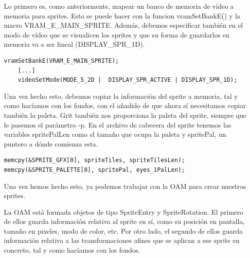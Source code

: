 Lo primero es, como anteriormente, mapear un banco de memoria de vídeo a memoria para sprites. Esto se puede hacer con la funcion vramSetBankE() y la macro VRAM\_E\_MAIN\_SPRITE. Además, debemos especificar también en el modo de vídeo que se visualicen los sprites y que su forma de guardarlos en memoria va a ser lineal (DISPLAY\_SPR\_1D).

\vspace{0.5cm}

\begin{lstlisting}[caption={Mapeo del banco E a memoria de sprites}, label={code:vrame}]
	vramSetBankE(VRAM_E_MAIN_SPRITE);
	[...]
	videoSetMode(MODE_5_2D |  DISPLAY_SPR_ACTIVE | DISPLAY_SPR_1D);
\end{lstlisting}

\vspace{0.5cm}

Una vez hecho esto, debemos copiar la información del sprite a memoria, tal y como hacíamos con los fondos, con el añadido de que ahora sí necesitamos copiar también la paleta. Grit también nos proporciona la paleta del sprite, siempre que le pasemos el parámetro -p. En el archivo de cabecera del sprite tenemos las variables spritePalLen como el tamaño que ocupa la paleta y spritePal, un puntero a dónde comienza esta.

\vspace{0.5cm}

\begin{lstlisting}[caption={Copia de la información de sprites a memoria de video}, label={code:spritememcpy}]
memcpy(&SPRITE_GFX[0], spriteTiles, spriteTilesLen);
memcpy(&SPRITE_PALETTE[0], spritePal, eyes_1PalLen);
\end{lstlisting}

\vspace{0.5cm}

Una vez hemos hecho esto, ya podemos trabajar con la OAM para crear nuestros sprites.

\vspace{0.5cm}

La OAM está formada objetos de tipo SpriteEntry y SpriteRotation. El primero de ellos guarda información relativa al sprite en sí, como su posición en pantalla, tamaño en pixeles, modo de color, etc. Por otro lado, el segundo de ellos guarda información relativa a las transformaciones afines que se aplican a ese sprite en concreto, tal y como hacíamos con los fondos.

\vspace{0.5cm}


